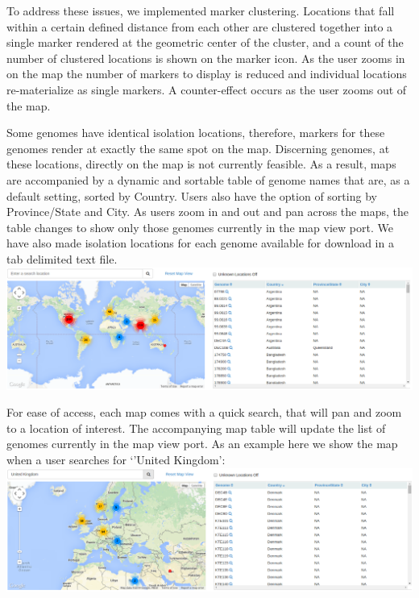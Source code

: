 \documentclass{bmcart}
\begin{document}
To address these issues, we implemented marker clustering. Locations that fall within a certain defined distance from each other are clustered together into a single marker rendered at the geometric center of the cluster, and a count of the number of clustered locations is shown on the marker icon. As the user zooms in on the map the number of markers to display is reduced and individual locations re-materialize as single markers. A counter-effect occurs as the user zooms out of the map. 

\pagebreak
\begin{landscape}
Some genomes have identical isolation locations, therefore, markers for these genomes render at exactly the same spot on the map. Discerning genomes, at these locations, directly on the map is not currently feasible. As a result, maps are accompanied by a dynamic and sortable table of genome names that are, as a default setting, sorted by Country. Users also have the option of sorting by Province/State and City. As users zoom in and out and pan across the maps, the table changes to show only those genomes currently in the map view port. We have also made isolation locations for each genome available for download in a tab delimited text file.\\

\includegraphics[scale=0.36]{../manuscript_images/map.png}
\end{landscape}
\pagebreak

\begin{landscape}
For ease of access, each map comes with a quick search, that will pan and zoom to a location of interest. The accompanying map table will update the list of genomes currently in the map view port. As an example here we show the map when a user searches for `'United Kingdom':\\

\includegraphics[scale=0.36]{../manuscript_images/uk-map.png}
\end{landscape}
\end{document}
